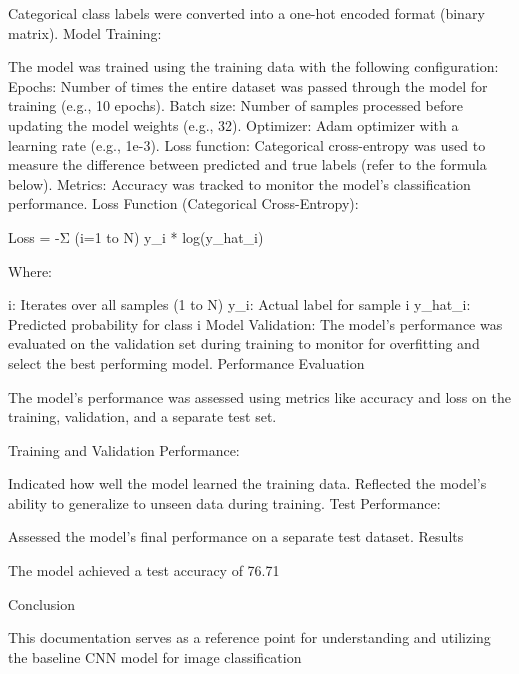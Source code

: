 Categorical class labels were converted into a one-hot encoded format (binary matrix).
Model Training:

The model was trained using the training data with the following configuration:
Epochs: Number of times the entire dataset was passed through the model for training (e.g., 10 epochs).
Batch size: Number of samples processed before updating the model weights (e.g., 32).
Optimizer: Adam optimizer with a learning rate (e.g., 1e-3).
Loss function: Categorical cross-entropy was used to measure the difference between predicted and true labels (refer to the formula below).
Metrics: Accuracy was tracked to monitor the model's classification performance.
Loss Function (Categorical Cross-Entropy):

Loss = -Σ (i=1 to N) y_i * log(y_hat_i)

Where:

i: Iterates over all samples (1 to N)
y_i: Actual label for sample i
y_hat_i: Predicted probability for class i
Model Validation:
The model's performance was evaluated on the validation set during training to monitor for overfitting and select the best performing model.
Performance Evaluation

The model's performance was assessed using metrics like accuracy and loss on the training, validation, and a separate test set.

Training and Validation Performance:

Indicated how well the model learned the training data.
Reflected the model's ability to generalize to unseen data during training.
Test Performance:

Assessed the model's final performance on a separate test dataset.
Results

The model achieved a test accuracy of 76.71%

Conclusion

This documentation serves as a reference point for understanding and utilizing the baseline CNN model for image classification